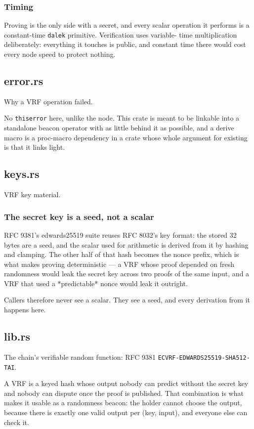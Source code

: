 \documentclass[11pt,a4paper]{article}
\begin{document}
\subsubsection{Timing}

Proving is the only side with a secret, and every scalar operation it
performs is a constant-time \texttt{dalek} primitive. Verification uses variable-
time multiplication deliberately: everything it touches is public, and
constant time there would cost every node speed to protect nothing.

\subsection{error.rs}
Why a VRF operation failed.

No \texttt{thiserror} here, unlike the node. This crate is meant to be linkable
into a standalone beacon operator with as little behind it as possible, and
a derive macro is a proc-macro dependency in a crate whose whole argument
for existing is that it links light.

\subsection{keys.rs}
VRF key material.

\subsubsection{The secret key is a seed, not a scalar}

RFC 9381's edwards25519 suite reuses RFC 8032's key format: the stored 32
bytes are a seed, and the scalar used for arithmetic is derived from it by
hashing and clamping. The other half of that hash becomes the nonce prefix,
which is what makes proving deterministic — a VRF whose proof depended on
fresh randomness would leak the secret key across two proofs of the same
input, and a VRF that used a *predictable* nonce would leak it outright.

Callers therefore never see a scalar. They see a seed, and every derivation
from it happens here.

\subsection{lib.rs}
The chain's verifiable random function: RFC 9381
\texttt{ECVRF-EDWARDS25519-SHA512-TAI}.

A VRF is a keyed hash whose output nobody can predict without the secret key
and nobody can dispute once the proof is published. That combination is what
makes it usable as a randomness beacon: the holder cannot choose the output,
because there is exactly one valid output per (key, input), and everyone
else can check it.
\end{document}
